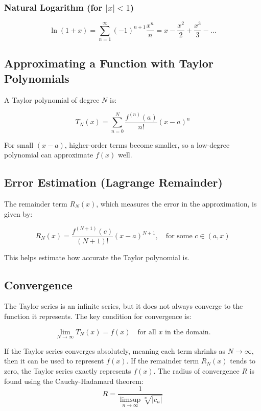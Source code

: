 \documentclass[../Main.tex]{subfiles}
\begin{document}
\subsubsection{Natural Logarithm (for $|x| < 1$)}
\begin{equation}
\ln(1+x) = \sum_{n=1}^{\infty} (-1)^{n+1} \frac{x^n}{n} = x - \frac{x^2}{2} + \frac{x^3}{3} - \dots
\end{equation}

\subsection{Approximating a Function with Taylor Polynomials}

A Taylor polynomial of degree $N$ is:

\begin{equation}
T_N(x) = \sum_{n=0}^{N} \frac{f^{(n)}(a)}{n!} (x - a)^n
\end{equation}

For small $(x-a)$, higher-order terms become smaller, so a low-degree polynomial can approximate $f(x)$ well.

\subsection{Error Estimation (Lagrange Remainder)}

The remainder term $R_N(x)$, which measures the error in the approximation, is given by:

\begin{equation}
R_N(x) = \frac{f^{(N+1)}(c)}{(N+1)!} (x - a)^{N+1}, \quad \text{for some } c \in (a, x)
\end{equation}

This helps estimate how accurate the Taylor polynomial is.

\subsection{Convergence}
The Taylor series is an infinite series, but it does not always converge to the function it represents. The key condition for convergence is:

\begin{equation} \lim_{N \to \infty} T_N(x) = f(x) \quad \text{for all } x \text{ in the domain}. \end{equation}

If the Taylor series converges absolutely, meaning each term shrinks as $N \to \infty$, then it can be used to represent $f(x)$.
If the remainder term $R_N(x)$ tends to zero, the Taylor series exactly represents $f(x)$.
The radius of convergence $R$ is found using the Cauchy-Hadamard theorem:
\begin{equation} R = \frac{1}{\limsup\limits_{n \to \infty} \sqrt[n]{|c_n|}} \end{equation}
\end{document}

